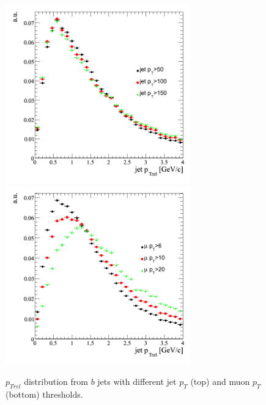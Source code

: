 \begin{figure}[htbp]
  \begin{center}
    \includegraphics[width=80mm]{Figures/jet_ptrelb_jetcuts.png}
    \includegraphics[width=80mm]{Figures/jet_ptrelb_mucuts.png}
  \end{center}
  \caption{$p_{Trel}$ distribution from $b$ jets with different jet $p_T$ (top) and muon $p_T$ (bottom) thresholds.}
  \label{fig:jet_ptrel_b_cuts}
\end{figure}

